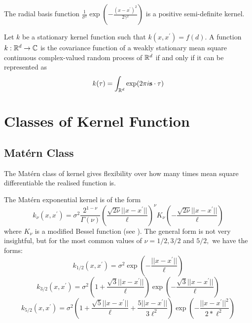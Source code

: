 \color{red}

\begin{theorem}\label{thm:rbf_pos_def}
    The radial basis function
    $\frac{1}{\sigma^2}\exp(-\frac{(x - x^\prime)^2}{2\gamma^2})$ is a positive
    semi-definite kernel.
\end{theorem}

\begin{theorem}
    Let $k$ be a stationary kernel function such that
    $k(x, x^\prime) = f(d)$. A function $k:\mathbb{R}^d\to\mathbb{C}$ is the covariance
    function of a weakly
    stationary mean square continuous complex-valued random process of $\mathbb{R}^d$
    if and only if it can be represented as
    $$k(\mathbf{\tau}) = \int_{\mathbb{R}^d} \exp(2\pi i \mathbf{s}\cdot\mathbf{\tau})$$
\end{theorem}

\parencite[82]{rasmussen_gaussian_2008}

\color{black}

\section{Classes of Kernel Function}

\subsection*{Mat\'{e}rn Class}

\begin{figure}
\end{figure}

The Mat\'ern class of kernel gives flexibility over how many times mean square
differentiable the realised function is.

The Mat\'ern exponential kernel is of the form
$$k_\nu(x, x^\prime)
    = \sigma^2\frac{2^{1 - \nu}}{\Gamma(\nu)}
    \left(\frac{\sqrt{2\nu}||x - x^\prime||}{\ell}\right)^\nu
    K_\nu\left(-\frac{\sqrt{2\nu}||x - x^\prime||}{\ell}\right)$$
where $K_\nu$ is a modified Bessel function (see \cite[374]{abramowitz_handbook_2013}). The general form is not very insightful, but for the most common values of $\nu = 1/2, 3/2$ and $5/2,$ we have the forms:
$$k_{1/2}(x, x^\prime)
    = \sigma^2\exp\left(-\frac{||x - x^\prime||}{\ell}\right)$$
$$k_{3/2}(x, x^\prime)
    = \sigma^2
    \left(1 + \frac{\sqrt{3}||x - x^\prime||}{\ell}\right)
    \exp\left(-\frac{\sqrt{3}||x - x^\prime||}{\ell}\right)$$
$$k_{5/2}(x, x^\prime)
    = \sigma^2
    \left(
    1 + \frac{\sqrt{5}||x - x^\prime||}{\ell} + \frac{5||x - x^\prime||}{3\ell^2}
    \right)
    \exp\left(-\frac{||x - x^\prime||^2}{2*\ell^2}\right)$$

